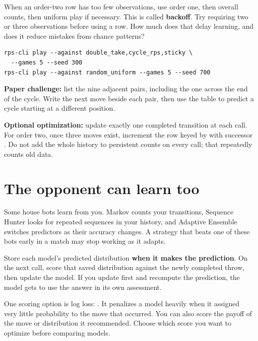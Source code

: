 \documentclass[11pt]{article}
\begin{document}
When an order-two row has too few observations, use order one, then overall counts, then uniform play if necessary. This is called \textbf{backoff}. Try requiring two or three observations before using a row. How much does that delay learning, and does it reduce mistakes from chance patterns?


\begin{lstlisting}[style=shell]
rps-cli play --against double_take,cycle_rps,sticky \
  --games 5 --seed 300
rps-cli play --against random_uniform --games 5 --seed 700
\end{lstlisting}

\begin{summit}
\textbf{Paper challenge:} list the nine adjacent pairs, including the one across the end of the cycle. Write the next move beside each pair, then use the table to predict a cycle starting at a different position.
\end{summit}

\textbf{Optional optimization:} update exactly one completed transition at each call. For order two, once three moves exist, increment the row keyed by  with successor . Do not add the whole history to persistent counts on every call; that repeatedly counts old data.
\par
\clearpage
\section*{The opponent can learn too}

\begin{context}
Some house bots learn from you. Markov counts your transitions, Sequence Hunter looks for repeated sequences in your history, and Adaptive Ensemble switches predictors as their accuracy changes. A strategy that beats one of these bots early in a match may stop working as it adapts.

\end{context}


Store each model's predicted distribution \textbf{when it makes the prediction}. On the next call, score that saved distribution against the newly completed throw, then update the model. If you update first and recompute the prediction, the model gets to use the answer in its own assessment.


One scoring option is log loss: . It penalizes a model heavily when it assigned very little probability to the move that occurred. You can also score the payoff of the move or distribution it recommended. Choose which score you want to optimize before comparing models.
\end{document}

